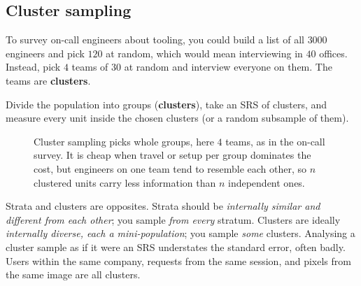 \subsection{Cluster sampling}

To survey on-call engineers about tooling, you could build a list of all $3000$
engineers and pick $120$ at random, which would mean interviewing in $40$ offices.
Instead, pick $4$ teams of $30$ at random and interview everyone on them. The teams are
\textbf{clusters}.

\begin{definition}
Divide the population into groups (\textbf{clusters}), take an SRS of clusters, and
measure every unit inside the chosen clusters (or a random subsample of them).
\end{definition}

\begin{figure}[H]
\centering
{}
\caption{Cluster sampling picks whole groups, here $4$ teams, as in the on-call survey.
It is cheap when travel or setup per group dominates the cost, but engineers on one team
tend to resemble each other, so $n$ clustered units carry less information than $n$
independent ones.}
\label{fig:sampling-cluster}
\end{figure}

\begin{trapbox}
Strata and clusters are opposites. Strata should be \emph{internally similar and
different from each other}; you sample \emph{from every} stratum. Clusters are ideally
\emph{internally diverse, each a mini-population}; you sample \emph{some} clusters.
Analysing a cluster sample as if it were an SRS understates the standard error, often
badly. Users within the same company, requests from the same session, and pixels from
the same image are all clusters.
\end{trapbox}

